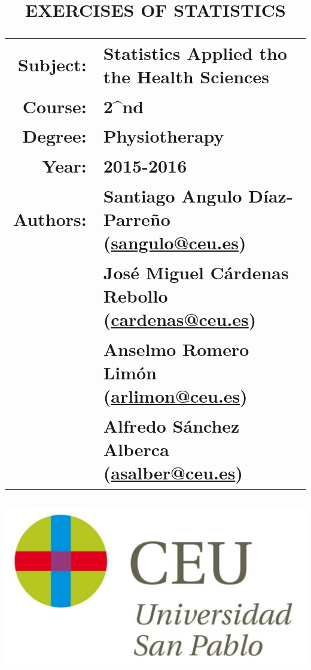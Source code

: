 \documentclass[a4paper,titlepage]{article}
\begin{document}
\sloppy

\title{\vskip 2cm
\Huge \textbf{\textsf{\quad \textcolor{blueceu}{EXERCISES OF STATISTICS}\quad}}\\
   \vskip 1cm
\Large \sffamily
\begin{tabular}{rl}
\textcolor{blueceu}{Subject:} & Statistics Applied tho the Health Sciences\\
\textcolor{blueceu}{Course:} & 2^{nd}\\
\textcolor{blueceu}{Degree:} &  Physiotherapy\\
\textcolor{blueceu}{Year:} & 2015-2016\\
\textcolor{blueceu}{Authors:} & Santiago Angulo Díaz-Parreño (\url{sangulo@ceu.es})\\
& José Miguel Cárdenas Rebollo (\url{cardenas@ceu.es})\\
& Anselmo Romero Limón (\url{arlimon@ceu.es})\\
& Alfredo Sánchez Alberca (\url{asalber@ceu.es})
\end{tabular}
}

\author{}
\date{\includegraphics[scale=0.3]{img/logo_uspceu}}

\maketitle
\newpage
\tableofcontents
\newpage


\end{document}
